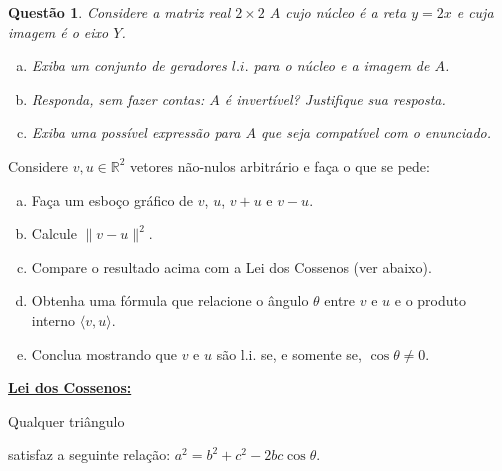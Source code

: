 \documentclass[a4paper,10pt]{article}
\def\R{\mathbb R}
\newtheorem{qst}{Questão}
\begin{document}
\begin{qst}
	Considere a matriz real $2\times 2$ $A$ cujo núcleo é a reta $y=2x$ e cuja imagem é o eixo $Y$.
	\begin{enumerate}[a)]
		\item Exiba um conjunto de geradores $l.i.$ para o núcleo e a imagem de $A$.
		\item Responda, sem fazer contas: $A$ é invertível? Justifique sua resposta.
		\item Exiba uma possível expressão para $A$ que seja compatível com o enunciado.
	\end{enumerate}
\end{qst}

\begin{bonus}
	Considere $v,u\in\R^2$ vetores não-nulos arbitrário e faça o que se pede:
	\begin{enumerate}[a)]		
		\item Faça um esboço gráfico de $v$, $u$, $v+u$ e $v-u$.
		\item Calcule $\lVert v-u\rVert^2$.
		\item Compare o resultado acima com a Lei dos Cossenos (ver abaixo).
		\item Obtenha uma fórmula que relacione o ângulo $\theta$ entre $v$ e $u$ e o produto interno $\langle v,u\rangle$.
		\item Conclua mostrando que $v$ e $u$ são l.i. se, e somente se, $\cos\theta\neq 0$.
	\end{enumerate}
\end{bonus}

\textbf{\underline{Lei dos Cossenos:}}

Qualquer triângulo
satisfaz a seguinte relação: $a^2=b^2+c^2-2bc\cos\theta$.
\end{document}
